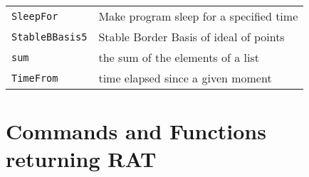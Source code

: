 \documentclass[a4paper]{mybook}
\begin{document}
\begin{center}
\begin{longtable}{ll}
{\verb~SleepFor~} &
      Make program sleep for a specified time\\
   
{\verb~StableBBasis5~} &
      Stable Border Basis of ideal of points\\
   
{\verb~sum~} &
      the sum of the elements of a list\\
   
{\verb~TimeFrom~} &
      time elapsed since a given moment\\
   
\end{longtable}
\end{center}

\noindent



\section{Commands and Functions returning RAT}
\label{Commands and Functions returning RAT}

        
\end{document}
